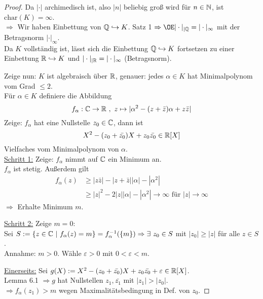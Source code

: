 \begin{proof}
Da $|\cdot|$ archimedisch ist, also $|n|$ beliebig groß wird für $n \in \mathbb{N}$, ist $\mathrm{char}(K)=\infty$.\\
$\Rightarrow$ Wir haben Einbettung von $\mathbb{Q} \hookrightarrow K$. Satz 1 $\Rightarrow \OE |\cdot|_{|\Q}=|\cdot|_\infty$ mit der Betragsnorm $|\cdot|_\infty$.\\
Da $K$ vollständig ist, lässt sich die Einbettung $\mathbb{Q} \hookrightarrow K$ fortsetzen zu einer Einbettung $\mathbb{R} \hookrightarrow K$ und $|\cdot|_{|\mathbb{R}}=|\cdot|_{\infty}$ (Betragsnorm).

Zeige nun: $K$ ist algebraisch über $\mathbb{R}$, genauer: jedes $\alpha \in K$ hat Minimalpolynom vom Grad $\leq 2$.\\
Für $\alpha \in K$ definiere die Abbildung
\[f_\alpha: \mathbb{C} \to \mathbb{R} \ , \ z \mapsto |\alpha^2-(z+\bar{z})\alpha +z\bar{z}|\]
Zeige: $f_\alpha$ hat eine Nullstelle $z_0 \in \mathbb{C}$, dann ist
\[X^2-(z_0+\bar{z_0})X+z_0\bar{z_0} \in \mathbb{R}[X]\]
Vielfaches vom Minimalpolynom von $\alpha$.\\
\underline{Schritt 1:} Zeige: $f_\alpha$ nimmt auf $\mathbb{C}$ ein Minimum an.\\
$f_\alpha$ ist stetig. Außerdem gilt
\begin{align*}
f_\alpha(z) &\geq |z\bar{z}|-|z+\bar{z}||\alpha|-|\alpha^2|\\
&\geq |z|^2-2|z||\alpha|-|\alpha^2| \to \infty \text{ für } |z| \to \infty
\end{align*}
$\Rightarrow$ Erhalte Minimum $m$.

\underline{Schritt 2:} Zeige $m=0$:\\
Sei $S:=\{z \in \C \ | \ f_\alpha(z)=m\}=f_\alpha^{-1}(\{m\}) \Rightarrow \exists \ z_0 \in S$ mit $|z_0| \geq |z|$ für alle $z \in S$.\\
Annahme: $m >0$. Wähle $\varepsilon>0$ mit $0<\varepsilon<m$.

\underline{Einerseits:} Sei $g(X):=X^2-(z_0+\bar{z_0})X+z_0\bar{z_0}+\varepsilon \in \mathbb{R}[X]$.\\
Lemma 6.1 $\Rightarrow g$ hat Nullstellen $z_1, \bar{z_1}$ mit $|z_1|>|z_0|$.\\
$\Rightarrow f_\alpha(z_1) >m$ wegen Maximalitätsbedingung in Def. von $z_0$.


\end{proof}
